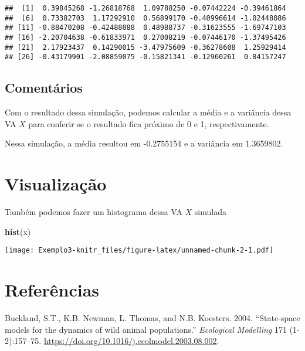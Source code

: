\documentclass[]{article}
\newenvironment{Shaded}{\begin{snugshade}}{\end{snugshade}}
\newcommand{\KeywordTok}[1]{\textcolor[rgb]{0.13,0.29,0.53}{\textbf{#1}}}
\newcommand{\NormalTok}[1]{#1}
\begin{document}
\begin{verbatim}
##  [1]  0.39845268 -1.26818768  1.09788250 -0.07442224 -0.39461864
##  [6]  0.73382703  1.17292910  0.56899170 -0.40996614 -1.02448086
## [11] -0.88470208 -0.42488088  0.48988737 -0.31623555 -1.69747103
## [16] -2.20704638 -0.61833971  0.27008219 -0.07446170 -1.37495426
## [21]  2.17923437  0.14290015 -3.47975609 -0.36278608  1.25929414
## [26] -0.43179901 -2.08859075 -0.15821341 -0.12960261  0.84157247
\end{verbatim}

\hypertarget{comentarios}{%
\subsection{Comentários}\label{comentarios}}

Com o resultado dessa simulação, podemos calcular a média e a variância
dessa VA \(X\) para conferir se o resultado fica próximo de 0 e 1,
respectivamente.

Nessa simulação, a média resultou em -0.2755154 e a variância em
1.3659802.

\hypertarget{visualizacao}{%
\section{Visualização}\label{visualizacao}}

Também podemos fazer um histograma dessa VA \(X\) simulada

\begin{Shaded}
\begin{Highlighting}[]
\KeywordTok{hist}\NormalTok{(x)}
\end{Highlighting}
\end{Shaded}

\texttt{[image: Exemplo3-knitr\_files/figure-latex/unnamed-chunk-2-1.pdf]}

\hypertarget{referencias}{%
\section*{Referências}\label{referencias}}

\hypertarget{refs}{}
\leavevmode\hypertarget{ref-Buckland2004}{}%
Buckland, S.T., K.B. Newman, L. Thomas, and N.B. Koesters. 2004.
``State-space models for the dynamics of wild animal populations.''
\emph{Ecological Modelling} 171 (1-2):157--75.
\url{https://doi.org/10.1016/j.ecolmodel.2003.08.002}.
\end{document}
